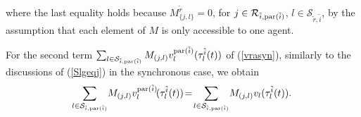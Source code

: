 \documentclass[journal]{IEEEtran}
\begin{document}
where the last equality holds because $M_{\{j,l\}}^{\tilde{r}}=0$, for $j\in \mathcal{R}_{\tilde{i},{\rm par}(\tilde{i})}$, $l\in \mathcal{S}_{\tilde{r},\tilde{i}}$, by the assumption that each element of $M$ is only accessible to one agent. 
\par For the second term $\sum_{l\in \mathcal{S}_{\tilde{i},{\rm par}(\tilde{i})}} M_{(j,l)} {v}_l^{{\rm par}({\tilde{i}})}(\tau_{l}^{\tilde{i}}(t))$ of (\ref{vrasyn}), similarly to the discussions of (\ref{Slgeqj}) in the synchronous case, we obtain
\begin{align}\label{secondterm}
\!\sum_{l\in \mathcal{S}_{\tilde{i},{\rm par}(\tilde{i})}}\! M_{(j,l)} {v}_l^{{\rm par}({\tilde{i}})}\!(\tau_{l}^{\tilde{i}}(t))\!=\!\sum_{l\in \mathcal{S}_{\tilde{i},{\rm par}(\tilde{i})}} \! M_{(j,l)} {v}_l(\tau_{l}^{\tilde{i}}(t)).
\end{align}
\end{document}
